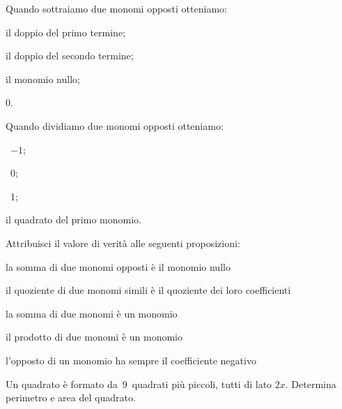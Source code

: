 \begin{esercizio}
 \label{ese:10.39} %
Quando sottraiamo due monomi opposti otteniamo:
\begin{multicols}{2}
\begin{enumeratea}
\item il doppio del primo termine;
\item il doppio del secondo termine;
\item il monomio nullo;
\item 0.
\end{enumeratea}
\end{multicols}
\end{esercizio}
\pagebreak
\begin{esercizio}
 \label{ese:10.40} %
Quando dividiamo due monomi opposti otteniamo:
\begin{enumeratea}
\begin{multicols}{2}
\item~$-1$;
\item~0;
\item~1;
\item il quadrato del primo monomio.
\end{multicols}
\end{enumeratea}
\end{esercizio}

\begin{esercizio}
 \label{ese:10.41} %
Attribuisci il valore di verità alle seguenti proposizioni:
\TabPositions{11cm}
\begin{enumeratea}
 \item la somma di due monomi opposti è il monomio nullo \tab\boxV\quad\boxF
 \item il quoziente di due monomi simili è il quoziente dei loro coefficienti \tab\boxV\quad\boxF
 \item la somma di due monomi è un monomio \tab\boxV\quad\boxF
 \item il prodotto di due monomi è un monomio \tab\boxV\quad\boxF
 \item l'opposto di un monomio ha sempre il coefficiente negativo \tab\boxV\quad\boxF
\end{enumeratea}
\end{esercizio}

\begin{esercizio}[\Ast]
 \label{ese:10.42} %
Un quadrato è formato da~9~quadrati più piccoli, tutti di lato $ 2x $. Determina perimetro e area del quadrato.
\end{esercizio}

